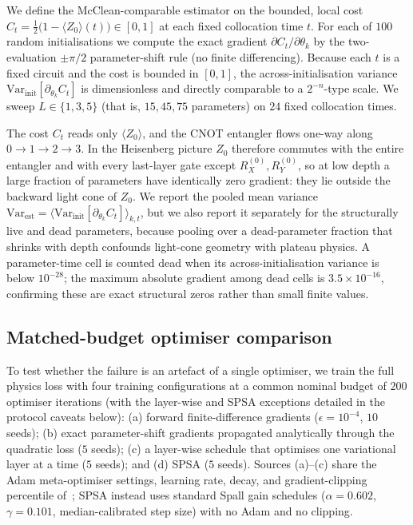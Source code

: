 \documentclass[a4paper,12pt]{iopart}
\newcommand{\Var}{\mathrm{Var}}
\newcommand{\Zexp}[1]{\langle Z_{#1}\rangle}
\begin{document}
We define the McClean-comparable estimator on the bounded, local cost
$C_t = \tfrac{1}{2}\bigl(1 - \Zexp{0}(t)\bigr) \in [0,1]$ at each fixed
collocation time $t$. For each of $100$ random initialisations we compute the
exact gradient $\partial C_t/\partial\theta_k$ by the two-evaluation
$\pm\pi/2$ parameter-shift rule (no finite differencing). Because each $t$ is a
fixed circuit and the cost is bounded in $[0,1]$, the across-initialisation
variance $\Var_{\text{init}}[\partial_{\theta_k}C_t]$ is dimensionless and
directly comparable to a $2^{-n}$-type scale. We sweep $L\in\{1,3,5\}$ (that is,
$15,45,75$ parameters) on $24$ fixed collocation times.

The cost $C_t$ reads only $\Zexp{0}$, and the CNOT entangler flows one-way along
$0\!\to\!1\!\to\!2\!\to\!3$. In the Heisenberg picture $Z_0$ therefore commutes
with the entire entangler and with every last-layer gate except $R_X^{(0)},
R_Y^{(0)}$, so at low depth a large fraction of parameters have identically zero
gradient: they lie outside the backward light cone of $Z_0$. We report the
pooled mean variance $\Var_{\text{est}}=\langle
\Var_{\text{init}}[\partial_{\theta_k}C_t]\rangle_{k,t}$, but we also report it
separately for the structurally live and dead parameters, because pooling over a
dead-parameter fraction that shrinks with depth confounds light-cone geometry
with plateau physics. A parameter-time cell is counted dead when its
across-initialisation variance is below $10^{-28}$; the maximum absolute
gradient among dead cells is $3.5\times10^{-16}$, confirming these are exact
structural zeros rather than small finite values.

\subsection{Matched-budget optimiser comparison}
\label{ssec:methods-opt}

To test whether the failure is an artefact of a single optimiser, we train the
full physics loss with four training configurations at a common nominal budget of $200$
optimiser iterations (with the layer-wise and SPSA exceptions detailed in the
protocol caveats below): (a) forward finite-difference gradients ($\epsilon=10^{-4}$,
$10$ seeds); (b) exact parameter-shift gradients propagated analytically through
the quadratic loss ($5$ seeds); (c) a layer-wise schedule that optimises one
variational layer at a time ($5$ seeds); and (d) SPSA ($5$ seeds). Sources
(a)--(c) share the Adam meta-optimiser settings, learning rate, decay, and
gradient-clipping percentile of~\cite{pandey2604}; SPSA instead uses standard
Spall gain schedules ($\alpha=0.602$, $\gamma=0.101$, median-calibrated step
size) with no Adam and no clipping.
\end{document}
